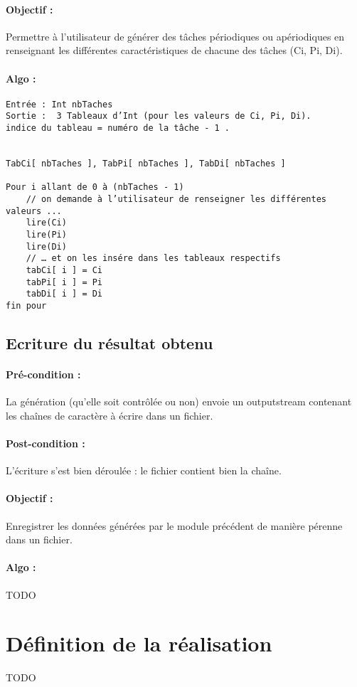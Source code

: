 		\paragraph{Objectif :} Permettre à l’utilisateur de générer des tâches périodiques ou apériodiques en renseignant les différentes caractéristiques de chacune des tâches (Ci, Pi, Di).
		\paragraph{Algo :} 
			\begin{verbatim}
Entrée : Int nbTaches
Sortie :  3 Tableaux d’Int (pour les valeurs de Ci, Pi, Di). 
indice du tableau = numéro de la tâche - 1 .


TabCi[ nbTaches ], TabPi[ nbTaches ], TabDi[ nbTaches ]
		
Pour i allant de 0 à (nbTaches - 1)
	// on demande à l’utilisateur de renseigner les différentes valeurs ...
	lire(Ci)
	lire(Pi)
	lire(Di)        
	// … et on les insére dans les tableaux respectifs
	tabCi[ i ] = Ci
	tabPi[ i ] = Pi
	tabDi[ i ] = Di
fin pour
			\end{verbatim}

	\subsection{Ecriture du résultat obtenu}
		\paragraph{Pré-condition :} La génération (qu'elle soit contrôlée ou non) envoie un outputstream contenant les chaînes de caractère à écrire dans un fichier.
		\paragraph{Post-condition :} L'écriture s'est bien déroulée : le fichier contient bien la chaîne.
		\paragraph{Objectif :} Enregistrer les données générées par le module précédent de manière pérenne dans un fichier.
		\paragraph{Algo :}
		\Huge
		TODO
		\normalsize

\section{Définition de la réalisation}
	\Huge
	TODO
	\normalsize

